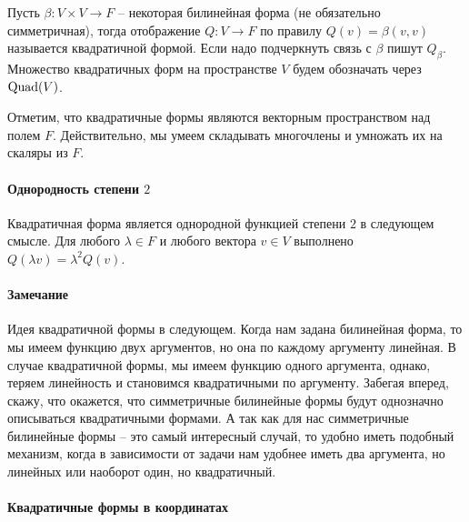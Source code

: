 \begin{definition}
Пусть $\beta\colon V\times V\to F$ -- некоторая билинейная форма (не обязательно симметричная), тогда отображение $Q\colon V\to F$ по правилу $Q(v) = \beta(v, v)$ называется квадратичной формой.
Если надо подчеркнуть связь с $\beta$ пишут $Q_\beta$.
 Множество квадратичных форм на пространстве $V$ будем обозначать через $\operatorname{Quad}(V)$.
\end{definition}

Отметим, что квадратичные формы являются векторным пространством над полем $F$.
Действительно, мы умеем складывать многочлены и умножать их на скаляры из $F$.

\paragraph{Однородность степени $2$}

Квадратичная форма является однородной функцией степени $2$ в следующем смысле.
Для любого $\lambda\in F$ и любого вектора $v\in V$ выполнено $Q(\lambda v) = \lambda^2 Q(v)$.


\paragraph{Замечание}

Идея квадратичной формы в следующем.
Когда нам задана билинейная форма, то мы имеем функцию двух аргументов, но она по каждому аргументу линейная.
В случае квадратичной формы, мы имеем функцию одного аргумента, однако, теряем линейность и становимся квадратичными по аргументу.
Забегая вперед, скажу, что окажется, что симметричные билинейные формы будут однозначно описываться квадратичными формами.
А так как для нас симметричные билинейные формы -- это самый интересный случай, то удобно иметь подобный механизм, когда в зависимости от задачи нам удобнее иметь два аргумента, но линейных или наоборот один, но квадратичный.


\paragraph{Квадратичные формы в координатах}

